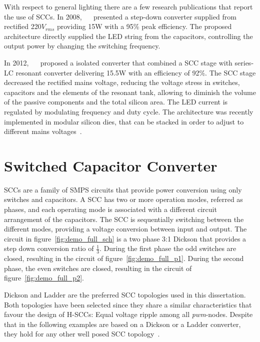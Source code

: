 With respect to general lighting there are a few research publications that report the use of SCCs. In 2008, ~\citeauthor{08Lee}~\cite{08Lee} presented a step-down converter supplied from rectified 220$V_{rms}$ providing 15W with a 95\% peak efficiency. The proposed architecture directly supplied the LED string from the capacitors, controlling the output power by changing the switching frequency.

In 2012, ~\citeauthor{2012Kline}~\cite{2012Kline} proposed a isolated converter that combined a SCC stage with series-LC resonant converter delivering 15.5W with an efficiency of  92\%.  The SCC stage decreased  the rectified mains voltage, reducing the voltage stress in switches, capacitors and the elements of the resonant tank, allowing to diminish  the volume of the passive components and the total silicon area. The LED current is regulated by modulating frequency and duty cycle.  The architecture was recently implemented in modular silicon dies, that can be stacked in order to adjust to different mains voltages~\cite{2013Kline}.



\section{Switched Capacitor Converter}

SCCs are a family of SMPS circuits that provide power conversion using only switches and capacitors. %
A SCC has two or more operation modes, referred as phases, and each operating mode is associated with a different circuit arrangement of the capacitors. The SCC is sequentially switching between the different modes, providing a voltage conversion between input and output. The circuit in figure~\ref{fig:demo_full_sch} is a two phase 3:1 Dickson that provides a step down conversion ratio of $\frac{1}{3}$. During the first phase the odd switches are closed, resulting in the circuit of figure~\ref{fig:demo_full_p1}. During the second phase, the even switches are closed, resulting in the circuit of figure~\ref{fig:demo_full_p2}.

Dickson and Ladder are the preferred SCC topologies used in this dissertation. Both topologies have been selected since they share a similar characteristics that favour the design of H-SCCs: Equal voltage ripple among all \emph{pwm}-nodes. Despite that in the following examples are based on a Dickson or a Ladder  converter, they hold for any other well posed SCC topology~\cite{Seeman:EECS-2009-78}.

